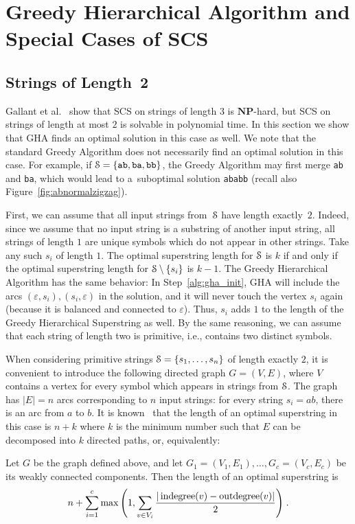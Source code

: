 \section{Greedy Hierarchical Algorithm and Special Cases of SCS}
\subsection{Strings of Length~2}\label{sec:ghatwo}
Gallant et al.~\cite{GMS1980} show that SCS on strings of length $3$ is $\mathbf{NP}$-hard, but SCS on strings of length at most $2$ is solvable in polynomial time. In this section we show that GHA finds an optimal solution in this case as well. We note that the standard Greedy Algorithm does not necessarily find an optimal solution in this case. For example, if ${\cal S}=\{{\tt ab}, {\tt ba}, {\tt bb}\}$, the Greedy Algorithm may first merge {\tt ab} and {\tt ba}, which would lead to a~suboptimal solution {\tt ababb}
(recall also Figure~\ref{fig:abnormalzigzag}).

First, we can assume that all input strings from~${\cal S}$ have length exactly~$2$. Indeed, since we assume that no input string is a substring of another input string, all strings of length $1$ are unique symbols which do not appear in other strings. Take any such $s_i$ of length $1$. The optimal superstring length for ${\cal S}$ is $k$ if and only if the optimal superstring length for ${\cal S}\setminus\{s_i\}$ is $k-1$. The Greedy Hierarchical Algorithm has the same behavior: In Step~\ref{alg:gha_init}, GHA will include the arcs $(\varepsilon, s_i), (s_i, \varepsilon)$ in the solution, and it will never touch the vertex $s_i$ again (because it is balanced and connected to $\varepsilon$). Thus, $s_i$ adds $1$ to the length of the Greedy Hierarchical Superstring as well. By the same reasoning, we can assume that each string of length two is primitive, i.e., contains two distinct symbols.

When considering primitive strings ${\cal S}=\{s_1,\ldots,s_n\}$ of length exactly $2$, it is convenient to introduce the following directed graph $G=(V, E)$, where $V$ contains a vertex for every symbol which appears in strings from ${\cal S}$. The graph has $|E|=n$ arcs corresponding to $n$ input strings: for every string $s_i=ab$, there is an arc from $a$ to $b$. It is known~\cite{GMS1980} that the length of an optimal superstring in this case is $n+k$ where $k$ is the minimum number such that $E$ can be decomposed into $k$ directed paths, or, equivalently:
\begin{proposition}
Let $G$ be the graph defined above, and let $G_1=(V_1,E_1),\ldots,G_c=(V_c,E_c)$ be its weakly connected components. Then the length of an optimal superstring is
\begin{align}
\label{eq:gms}
n + \sum_{i=1}^{c} {\max\left( 1, \sum_{v \in V_i}{ \frac{ |\operatorname{indegree}(v) - \operatorname{outdegree}(v)|}{2} }\right)} \; .
\end{align}
\end{proposition}

